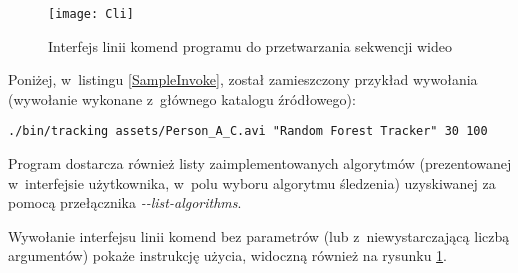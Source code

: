     \newpage
    \begin{figure}[!ht]
      \centering
      \texttt{[image: Cli]}
      \caption[Interfejs linii komend programu do przetwarzania sekwencji wideo]{Interfejs linii komend programu do przetwarzania sekwencji wideo}
      \label{fig:Cli}
    \end{figure}

    Poniżej, w~listingu \ref{SampleInvoke}, został zamieszczony przykład wywołania (wywołanie wykonane z~głównego katalogu źródłowego):
      \begin{sample}[ht]
        \begin{verbatim}
./bin/tracking assets/Person_A_C.avi "Random Forest Tracker" 30 100
        \end{verbatim}
        \caption{Przykładowe wywołanie interfejsu konsolowego}
        \label{SampleInvoke}
      \end{sample}

    Program dostarcza również listy zaimplementowanych algorytmów (prezentowanej w~interfejsie użytkownika, w~polu wyboru algorytmu śledzenia) uzyskiwanej za pomocą przełącznika \textit{-{}-list-algorithms}.

    Wywołanie interfejsu linii komend bez parametrów (lub z~niewystarczającą liczbą argumentów) pokaże instrukcję użycia, widoczną również na rysunku \ref{fig:Cli}.